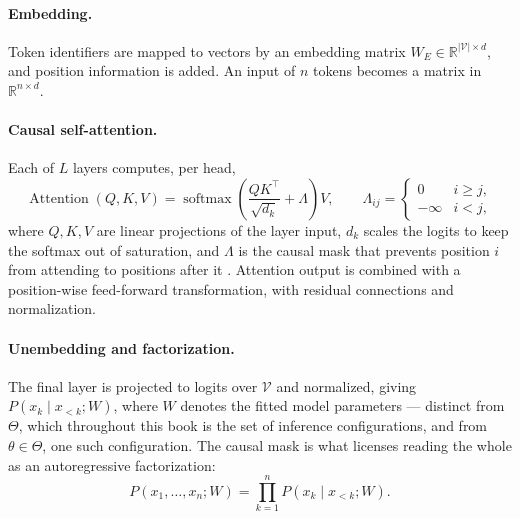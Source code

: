 \paragraph{Embedding.} Token identifiers are mapped to vectors by an embedding
matrix $W_E \in \mathbb{R}^{|\mathcal{V}| \times d}$, and position information is
added. An input of $n$ tokens becomes a matrix in $\mathbb{R}^{n \times d}$.

\paragraph{Causal self-attention.} Each of $L$ layers computes, per head,
\begin{equation}
  \operatorname{Attention}(Q, K, V)
  = \operatorname{softmax}\!\left(\frac{QK^{\top}}{\sqrt{d_k}} + \Lambda\right) V,
  \qquad
  \Lambda_{ij} = \begin{cases} 0 & i \ge j,\\ -\infty & i < j,\end{cases}
  \label{eq:attention}
\end{equation}
where $Q, K, V$ are linear projections of the layer input, $d_k$ scales the logits
to keep the softmax out of saturation, and $\Lambda$ is the causal mask that
prevents position $i$ from attending to positions after it
\citep{vaswani2017}. Attention output is combined with a position-wise
feed-forward transformation, with residual connections and normalization.

\paragraph{Unembedding and factorization.} The final layer is projected to logits
over $\mathcal{V}$ and normalized, giving $P(x_k \mid x_{<k}; W)$, where $W$ denotes
the fitted model parameters --- distinct from $\Theta$, which throughout this book is
the set of inference configurations, and from $\theta \in \Theta$, one such
configuration. The causal
mask is what licenses reading the whole as an autoregressive factorization:
\begin{equation}
  P(x_1, \ldots, x_n; W) = \prod_{k=1}^{n} P(x_k \mid x_{<k}; W).
  \label{eq:factorization}
\end{equation}

